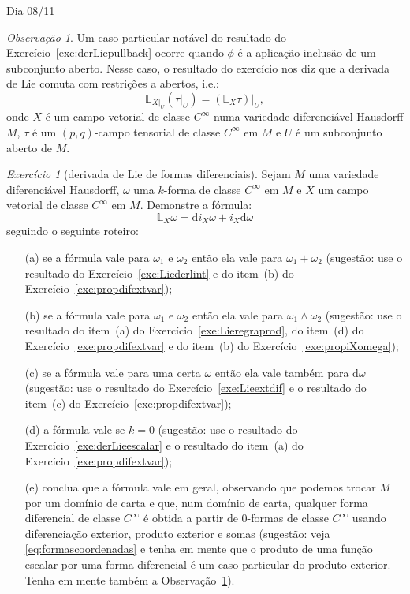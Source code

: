 \documentclass[oneside,11pt]{amsart}
\newcommand{\dd}{\mathrm d}
\theoremstyle{remark}\newtheorem{exercise}{Exercício}[section]
\theoremstyle{plain}\newtheorem{teo}{Teorema}[section]
\theoremstyle{plain}\newtheorem{lem}[teo]{Lema}
\theoremstyle{plain}\newtheorem{prop}[teo]{Proposição}
\theoremstyle{definition}\newtheorem{defin}[teo]{Definição}
\theoremstyle{remark}\newtheorem{rem}[teo]{Observação}
\theoremstyle{definition}\newtheorem{example}[teo]{Exemplo}
\numberwithin{equation}{section}
\begin{document}
\begin{section}{Dia 08/11}
\begin{rem}\label{thm:obsderLieaberto}
Um caso particular notável do resultado do Exercício~\ref{exe:derLiepullback} ocorre quando $\phi$ é a aplicação inclusão de um subconjunto aberto.
Nesse caso, o resultado do exercício nos diz que a derivada de Lie comuta com restrições a abertos, i.e.:
\[\mathbb L_{X\vert_U}(\tau\vert_U)=(\mathbb L_X\tau)\vert_U,\]
onde $X$ é um campo vetorial de classe $C^\infty$ numa variedade diferenciável Hausdorff $M$, $\tau$ é um $(p,q)$-campo tensorial de classe $C^\infty$ em $M$
e $U$ é um subconjunto aberto de $M$.
\end{rem}

\begin{exercise}[derivada de Lie de formas diferenciais]\label{exe:diid}
Sejam $M$ uma variedade diferenciável Hausdorff, $\omega$ uma $k$-forma de classe $C^\infty$ em $M$ e $X$ um campo vetorial de classe $C^\infty$ em $M$. Demonstre a fórmula:
\[\mathbb L_X\omega=\dd i_X\omega+i_X\dd\omega\]
seguindo o seguinte roteiro:
\begin{itemize}
\item[(a)] se a fórmula vale para $\omega_1$ e $\omega_2$ então ela vale para $\omega_1+\omega_2$ (sugestão: use o resultado do Exercício~\ref{exe:Liederlint}
e do item~(b) do Exercício~\ref{exe:propdifextvar});
\item[(b)] se a fórmula vale para $\omega_1$ e $\omega_2$ então ela vale para $\omega_1\wedge\omega_2$ (sugestão: use o resultado do item~(a)
do Exercício~\ref{exe:Lieregraprod}, do item~(d) do Exercício~\ref{exe:propdifextvar} e do item~(b) do Exercício~\ref{exe:propiXomega});
\item[(c)] se a fórmula vale para uma certa $\omega$ então ela vale também para $\dd\omega$ (sugestão: use o resultado do Exercício~\ref{exe:Lieextdif}
e o resultado do item~(c) do Exercício~\ref{exe:propdifextvar});
\item[(d)] a fórmula vale se $k=0$ (sugestão: use o resultado do Exercício~\ref{exe:derLieescalar} e o resultado do item~(a) do Exercício~\ref{exe:propdifextvar});
\item[(e)] conclua que a fórmula vale em geral, observando que podemos trocar $M$ por um domínio de carta e que, num domínio de carta, qualquer forma diferencial
de classe $C^\infty$ é obtida a partir de $0$-formas de classe $C^\infty$ usando diferenciação exterior, produto exterior e somas (sugestão:
veja \eqref{eq:formascoordenadas} e tenha em mente que o produto de uma função escalar por uma forma diferencial é um caso particular do produto exterior.
Tenha em mente também a Observação~\ref{thm:obsderLieaberto}).
\end{itemize}
\end{exercise}


\end{section}
\end{document}
